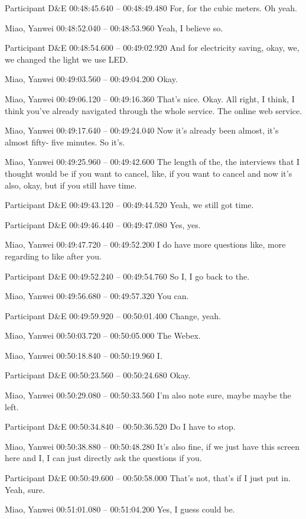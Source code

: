 {Participant D\&E 00:48:45.640 -- 00:48:49.480
For, for the cubic meters. Oh yeah.

Miao, Yanwei 00:48:52.040 -- 00:48:53.960
Yeah, I believe so.

Participant D\&E 00:48:54.600 -- 00:49:02.920
And for electricity saving, okay, we, we changed the light we use LED.

Miao, Yanwei 00:49:03.560 -- 00:49:04.200
Okay.

Miao, Yanwei 00:49:06.120 -- 00:49:16.360
That's nice. Okay. All right, I think, I think you've already navigated through the whole service. The online web service.

Miao, Yanwei 00:49:17.640 -- 00:49:24.040
Now it's already been almost, it's almost fifty- five minutes. So it's.

Miao, Yanwei 00:49:25.960 -- 00:49:42.600
The length of the, the interviews that I thought would be if you want to cancel, like, if you want to cancel and now it's also, okay, but if you still have time.

Participant D\&E 00:49:43.120 -- 00:49:44.520
Yeah, we still got time.

Participant D\&E 00:49:46.440 -- 00:49:47.080
Yes, yes.

Miao, Yanwei 00:49:47.720 -- 00:49:52.200
I do have more questions like, more regarding to like after you.

Participant D\&E 00:49:52.240 -- 00:49:54.760
So I, I go back to the.

Miao, Yanwei 00:49:56.680 -- 00:49:57.320
You can.

Participant D\&E 00:49:59.920 -- 00:50:01.400
Change, yeah.

Miao, Yanwei 00:50:03.720 -- 00:50:05.000
The Webex.

Miao, Yanwei 00:50:18.840 -- 00:50:19.960
I.

Participant D\&E 00:50:23.560 -- 00:50:24.680
Okay.

Miao, Yanwei 00:50:29.080 -- 00:50:33.560
I'm also note sure, maybe maybe the left.

Participant D\&E 00:50:34.840 -- 00:50:36.520
Do I have to stop.

Miao, Yanwei 00:50:38.880 -- 00:50:48.280
It's also fine, if we just have this screen here and I, I can just directly ask the questions if you.

Participant D\&E 00:50:49.600 -- 00:50:58.000
That's not, that's if I just put in. Yeah, sure.

Miao, Yanwei 00:51:01.080 -- 00:51:04.200
Yes, I guess could be.

}
